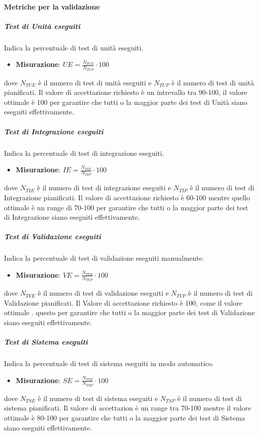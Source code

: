 \paragraph{Metriche per la validazione}


\subparagraph{Test di Unità eseguiti}
Indica la percentuale di test di unità eseguiti.
\begin{itemize}
	\item \textbf{Misurazione}: $UE=\frac{N_{TUE}}{N_{TUP}} \cdot 100$
\end{itemize}
dove $N_{TUE}$ è il numero di test di unità eseguiti e $N_{TUP}$ è il numero di test di unità pianificati.
Il valore di accettazione richiesto è un intrevallo tra 90-100, il valore ottimale è 100 per garantire che tutti o la maggior parte dei test di Unità siano eseguiti effettivamente.

\subparagraph{Test di Integrazione eseguiti}
Indica la percentuale di test di integrazione eseguiti. \\
\begin{itemize}
	\item \textbf{Misurazione}: $IE=\frac{N_{TIE}}{N_{TIP}} \cdot 100$
\end{itemize}
dove $N_{TIE}$ è il numero di test di integrazione eseguiti e $N_{TIP}$ è il numero di test di Integrazione pianificati.
Il valore di accettazione richiesto è 60-100 mentre quello ottimale è un range di 70-100 per	garantire che tutti o la maggior parte dei test di Integrazione siano eseguiti effettivamente. 

\subparagraph{Test di Validazione eseguiti}
Indica la percentuale di test di validazione eseguiti manualmente.
\begin{itemize}
	\item \textbf{Misurazione}: $VE=\frac{N_{TVE}}{N_{TVP}} \cdot 100$
\end{itemize}
dove $N_{TVE}$ è il numero di test di validazione eseguiti e $N_{TVP}$ è il numero di test di Validazione pianificati.
Il Valore di accettazione richiesto è 100, come il valore ottimale . questo per garantire che tutti o la maggior parte dei test di Validazione siano eseguiti effettivamente. 

\subparagraph{Test di Sistema eseguiti}
Indica la percentuale di test di sistema eseguiti in modo automatico.
\begin{itemize}
	\item \textbf{Misurazione}: $SE=\frac{N_{TSE}}{N_{TSP}} \cdot 100$
\end{itemize}
dove $N_{TSE}$ è il numero di test di sistema eseguiti e $N_{TSP}$ è il numero di test di sistema pianificati.
Il valore di accettazion è un range tra 70-100 mentre il valore ottimale è 80-100 per garantire che tutti o la maggior parte dei test di Sistema siano eseguiti effettivamente.

